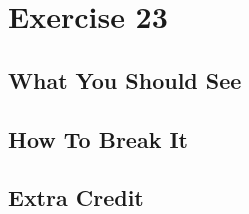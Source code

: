\chapter{Exercise 23}


\section{What You Should See}


\section{How To Break It}


\section{Extra Credit}



